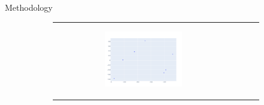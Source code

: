\documentclass[12pt]{amsart}
\begin{document}
\begin{section}{Methodology}
\begin{figure}
            \begin{subfigure}[c]{1\textwidth}
                \begin{tabular}{llll}
                \begin{subfigure}[c]{0.31\textwidth}
                    \centering
                    \begin{subfigure}[p]{1\textwidth}
                        \includegraphics[width=\linewidth]{../Code/Plots/examples/plot 1.png}
                        \label{}
                    \end{subfigure}


\end{subfigure}
\end{tabular}
\end{subfigure}
\end{figure}
\end{section}
\end{document}
